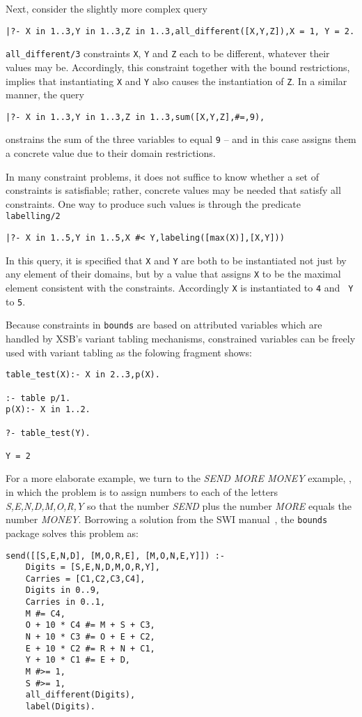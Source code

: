 Next, consider the slightly more complex query
%
{\small
\begin{verbatim}
|?- X in 1..3,Y in 1..3,Z in 1..3,all_different([X,Y,Z]),X = 1, Y = 2.
\end{verbatim}
}
%
\noindent
{\tt all\_different/3} constraints {\tt X}, {\tt Y} and {\tt Z} each
to be different, whatever their values may be.  Accordingly, this
constraint together with the bound restrictions, implies that
instantiating {\tt X} and {\tt Y} also causes the instantiation of
{\tt Z}.  In a similar manner, the query
%
{\small
\begin{verbatim}
|?- X in 1..3,Y in 1..3,Z in 1..3,sum([X,Y,Z],#=,9),
\end{verbatim}
}
%
\noindent
onstrains the sum of the three variables to equal {\tt 9} -- and in
this case assigns them a concrete value due to their domain
restrictions.

In many constraint problems, it does not suffice to know whether a set
of constraints is satisfiable; rather, concrete values may be needed
that satisfy all constraints.  One way to produce such values is
through the predicate {\tt labelling/2}
%
{\small
\begin{verbatim}
|?- X in 1..5,Y in 1..5,X #< Y,labeling([max(X)],[X,Y]))
\end{verbatim}
}
%
\noindent
In this query, it is specified that {\tt X} and {\tt Y} are both to be
instantiated not just by any element of their domains, but by a value
that assigns {\tt X} to be the maximal element consistent with the
constraints.  Accordingly {\tt X} is instantiated to {\tt 4} and {\tt
  Y} to {\tt 5}.

Because constraints in {\tt bounds} are based on attributed variables
which are handled by XSB's variant tabling mechanisms, constrained
variables can be freely used with variant tabling as the folowing
fragment shows:
%
{\small
\begin{verbatim}
table_test(X):- X in 2..3,p(X).

:- table p/1.
p(X):- X in 1..2.

?- table_test(Y).

Y = 2
\end{verbatim}
}
%

For a more elaborate example, we turn to the {\em SEND MORE MONEY}
example, , in which the problem is to assign numbers to each of the
letters {\em S,E,N,D,M,O,R,Y} so that the number {\em SEND} plus the
number {\em MORE} equals the number {\em MONEY}.  Borrowing a solution
from the SWI manual~\cite{SWI-manual}, the {\tt bounds} package solves
this problem as:
%
{\small
\begin{verbatim}
send([[S,E,N,D], [M,O,R,E], [M,O,N,E,Y]]) :-
    Digits = [S,E,N,D,M,O,R,Y],
    Carries = [C1,C2,C3,C4],
    Digits in 0..9,
    Carries in 0..1,
    M #= C4,
    O + 10 * C4 #= M + S + C3,
    N + 10 * C3 #= O + E + C2,
    E + 10 * C2 #= R + N + C1,
    Y + 10 * C1 #= E + D,
    M #>= 1,
    S #>= 1,
    all_different(Digits),
    label(Digits).
\end{verbatim}
}

